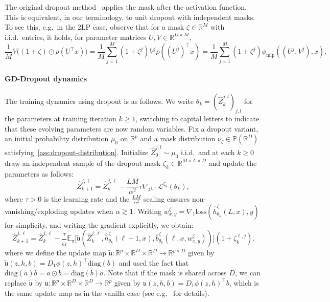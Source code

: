 \documentclass[a4paper,11pt]{article}
\newcommand{\R}{\mathbb{R}}
\newcommand{\1}{\mathbbm{1}}
\newcommand{\E}{\mathbb{E}}
\renewcommand{\P}{\mathbb{P}}
\renewcommand{\L}{\mathcal{L}}
\newcommand{\diag}{\mathrm{diag}}
\theoremstyle{definition}
\theoremstyle{remark}
\begin{document}
The original dropout method~\cite{srivastava2014dropout} applies the mask after the activation function. This is equivalent, in our terminology, to unit dropout with independent masks. To see this, e.g.~in the 2LP case, observe that for a mask $\zeta \in \R^{M}$ with i.i.d.~entries, it holds, for parameter matrices $U, V \in \R^{D\times M}$,
\[\frac{1}{M}V \big( (1+\zeta)\odot \rho (U^{\top} x)\big) = \frac{1}{M} \sum_{j=1}^M (1+\zeta^j) V^j\rho ({(U^j)}^\top x) = \frac{1}{M} \sum_{j=1}^M (1+\zeta^j) \phi_{\mathrm{mlp}}((U^j,V^j), x).\]

\paragraph{GD-Dropout dynamics}
The training dynamics using dropout is as follows. 
We write $\theta_k = {(\hat{Z}^{j,l}_k)}_{j,l}$ for the parameters at training iteration $k\geq 1$, switching to capital letters to indicate that these evolving parameters are now random variables. Fix a dropout variant, an initial probability distribution $\mu_0$ on $\mathbb{R}^p$ and a mask distribution $\nu_\zeta \in \P(\R^D)$ satisfying~\eqref{ass:dropout-distribution}. Initialize $\hat{Z}_{0}^{j,l} \sim \mu_0$ i.i.d.~and at each $k\geq0$ draw an independent sample of the dropout mask $\zeta_k \in \R^{M\times L\times D}$ and update the parameters as follows:
\[
\hat{Z}_{k+1}^{j,\ell} = \hat{Z}_{k}^{j,\ell} - \frac{LM}{\alpha^2}\tau \nabla_{z^{j,\ell}} \L^{\zeta_k}(\theta_k),
\]
where $\tau >0$ is the learning rate and the $\frac{LM}{\alpha^2}$ scaling ensures non-vanishing/exploding updates when $\alpha \gtrsim 1$.
Writing  
\(w^{\zeta}_{x,y} = \nabla_1 \mathrm{loss}(\hat{h}_{\theta_k}^{\zeta}(L, x), y)\) for simplicity, and writing the gradient explicitly, we obtain:
\begin{equation}\label{eq:parameter_update_resnet_dropout}
\hat{Z}_{k+1}^{j,\ell} = \hat{Z}_{k}^{j,\ell} - \frac{\tau}{\alpha}\E_{\pi}\big[\tilde{\mathfrak{u}}(\hat{Z}_{k}^{j,\ell}, \hat{h}_{\theta_k}^{\zeta}(\ell-1, x), \hat{b}_{\theta_k}^{\zeta}(\ell, x, w^{\zeta}_{x,y}))\big](1+ \zeta^{\ell, j}_k).
\end{equation}
where we define the update map $\tilde{\mathfrak{u}}: \R^{p}\times \R^D\times \R^D\to \R^{p\times D}$ given by $\tilde{\mathfrak{u}}(z, h, b) = {D_1\phi(z, h)}^{\top}\diag(b)$ and used the fact that $\diag(a)b = a \odot b = \diag(b)a$.
Note that if the mask is shared across $D$, we can replace $\tilde{\mathfrak{u}}$ by $\mathfrak{u}: \R^{p}\times \R^D\times \R^D\to \R^{p}$ given by $\mathfrak{u}(z, h, b) = {D_1\phi(z, h)}^{\top}b$, which is the same update map as in the vanilla case (see e.g.~\cite{chizat2025hidden} for details).
\end{document}
